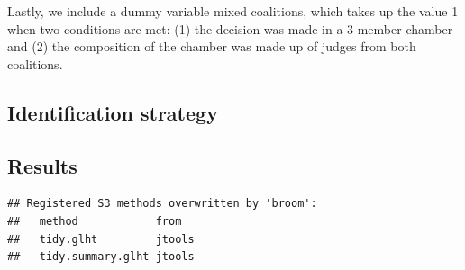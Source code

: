 \documentclass[
  11pt,
]{article}
\begin{document}
Lastly, we include a dummy variable mixed coalitions, which takes up the
value 1 when two conditions are met: (1) the decision was made in a
3-member chamber and (2) the composition of the chamber was made up of
judges from both coalitions.

\hypertarget{identification-strategy}{%
\subsection{Identification strategy}\label{identification-strategy}}

\hypertarget{results}{%
\subsection{Results}\label{results}}

\begin{verbatim}
## Registered S3 methods overwritten by 'broom':
##   method            from  
##   tidy.glht         jtools
##   tidy.summary.glht jtools
\end{verbatim}

 
  \providecommand{\huxb}[2]{\arrayrulecolor[RGB]{#1}\global\arrayrulewidth=#2pt}
  \providecommand{\huxvb}[2]{\color[RGB]{#1}\vrule width #2pt}
  \providecommand{\huxtpad}[1]{\rule{0pt}{#1}}
  \providecommand{\huxbpad}[1]{\rule[-#1]{0pt}{#1}}
\end{document}
